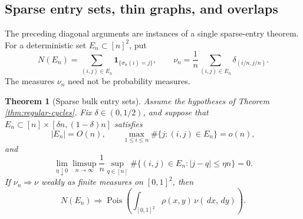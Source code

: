 \documentclass[11pt]{article}
\newtheorem{theorem}{Theorem}[section]
\theoremstyle{remark}
\newcommand{\one}{\mathbf 1}
\newcommand{\Pois}{\operatorname{Pois}}
\newcommand{\dd}{\,d}
\begin{document}
\subsection{Sparse entry sets, thin graphs, and overlaps}\label{subsec:sparse-entry}

The preceding diagonal arguments are instances of a single sparse-entry theorem.
For a deterministic set $E_n\subset[n]^2$, put
\[
        N(E_n)=\sum_{(i,j)\in E_n}\one_{\{\sigma_n(i)=j\}},
        \qquad
        \nu_n=\frac1n\sum_{(i,j)\in E_n}
        \delta_{(i/n,j/n)}.
\]
The measures $\nu_n$ need not be probability measures.

\begin{theorem}[Sparse bulk entry sets]\label{thm:sparse-entry}
Assume the hypotheses of Theorem \ref{thm:regular-cycles}.  Fix
$\delta\in(0,1/2)$, and suppose that $E_n\subset[n]\times
[\delta n,(1-\delta)n]$ satisfies
\[
        |E_n|=O(n),
        \qquad
        \max_{1\le i\le n}\#\{j:(i,j)\in E_n\}=o(n),
\]
and
\[
        \lim_{\eta\downarrow0}\limsup_{n\to\infty}
        \frac1n\sup_{q\in[n]}
        \#\{(i,j)\in E_n:|j-q|\le\eta n\}=0.
\]
If $\nu_n\Rightarrow\nu$ weakly as finite measures on $[0,1]^2$, then
\[
        N(E_n)\Rightarrow
        \Pois\!\left(\int_{[0,1]^2}\rho(x,y)\,\nu(\dd x,\dd y)\right).
\]
\end{theorem}
\end{document}
